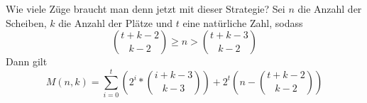\begin{frame}{Wie viele Züge braucht man denn jetzt mit dieser Strategie?}
    Sei $n$ die Anzahl der Scheiben, $k$ die Anzahl der Plätze und $t$ eine natürliche Zahl, sodass
    \[\binom{t+k-2}{k-2}\geq n>\binom{t+k-3}{k-2}\]
    Dann gilt
    \[M(n,k)=\sum_{i=0}^{t}\left(2^i*\binom{i+k-3}{k-3}\right)+2^t\left(n-\binom{t+k-2}{k-2}\right)\]
\end{frame}